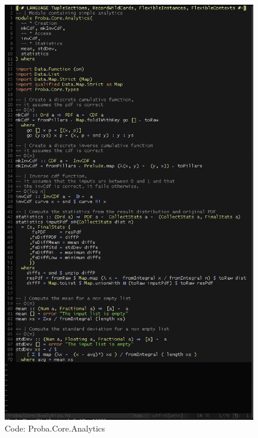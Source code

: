 \documentclass[12pt,a4paper,titlepage]{article}
\begin{document}
\begin{figure}[h!]
\centering
\includegraphics[width=1\textwidth]{img/code-analytics.png}
\caption{Code: Proba.Core.Analytics}
\label{fig:core.analytics}
\end{figure}
\end{document}
